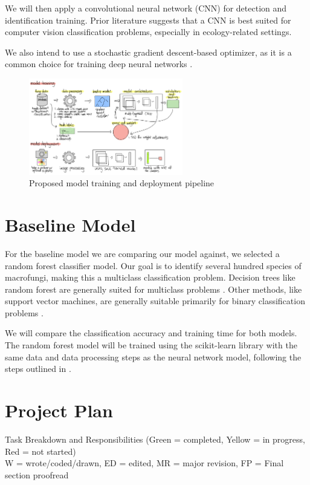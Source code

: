 \documentclass{article} %
\begin{document}
We will then apply a convolutional neural network (CNN) for detection and identification training. Prior literature \citep{BarreStoverEtAl.LeafNetComputerVision.2017} suggests that a CNN is best suited for computer vision classification problems, especially in ecology-related settings.

We also intend to use a stochastic gradient descent-based optimizer, as it is a common choice for training deep neural networks \citep{JamesWittenEtAl.IntroductionStatisticalLearning.2023}.

\begin{figure}[h]
  \begin{center}
  \includegraphics[width=0.6\textwidth]{figures/model.png}
  \end{center}
  \caption{Proposed model training and deployment pipeline}
\end{figure}

\section{Baseline Model}
For the baseline model we are comparing our model against, we selected a random forest classifier model. Our goal is to identify several hundred species of macrofungi, making this a multiclass classification problem. Decision trees like random forest are generally suited for multiclass problems \citep{GallRazaviEtAl.IntroductionRandomForests.2012}. Other methods, like support vector machines, are generally suitable primarily for binary classification problems \citep{JamesWittenEtAl.IntroductionStatisticalLearning.2023}. 

We will compare the classification accuracy and training time for both models. The random forest model will be trained using the scikit-learn library with the same data and data processing steps as the neural network model, following the steps outlined in \cite{Shafl.RandomForestClassification.2023}.

\section{Project Plan}
Task Breakdown and Responsibilities (Green = completed, Yellow = in progress, Red = not started)\\
W = wrote/coded/drawn, ED = edited, MR = major revision, FP = Final section proofread
\end{document}
